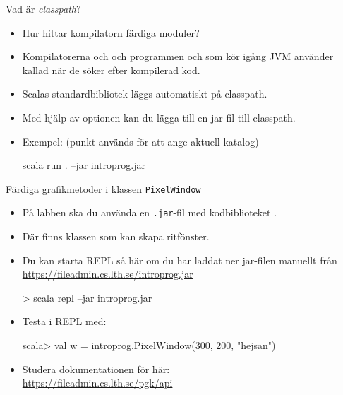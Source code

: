 \begin{Slide}{Vad är \emph{classpath}?}\SlideFontSmall
\begin{itemize}
  \item Hur hittar kompilatorn färdiga moduler?
\pause
\item Kompilatorerna  och  och programmen  och  som kör igång JVM använder  kallad  när de söker efter kompilerad kod.
\pause
\item Scalas standardbibliotek läggs automatiskt på classpath.
\item Med hjälp av optionen  kan du lägga till en jar-fil till classpath. %
\item Exempel: (punkt används för att ange aktuell katalog)
\begin{REPLnonum}
scala run . --jar introprog.jar
\end{REPLnonum}
\end{itemize}
\end{Slide}


\begin{Slide}{Färdiga grafikmetoder i klassen \texttt{PixelWindow}}\SlideFontSmall

\begin{itemize}
\item På labben ska du använda en \texttt{.jar}-fil med kodbiblioteket .
\item Där finns klassen  som kan skapa ritfönster.
\item Du kan starta REPL så här om du har laddat ner jar-filen manuellt från\\\url{https://fileadmin.cs.lth.se/introprog.jar}  %
\begin{REPLnonum}
> scala repl --jar introprog.jar 
\end{REPLnonum}
\item Testa  i REPL med:
\begin{REPLnonum}
scala> val w = introprog.PixelWindow(300, 200, "hejsan")
\end{REPLnonum}
\item Studera dokumentationen för  här: \\\url{https://fileadmin.cs.lth.se/pgk/api}
\end{itemize}
\end{Slide}


